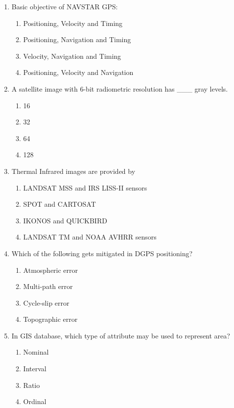 \documentclass[12pt,a4paper]{article}
\begin{document}
\begin{enumerate}
\item Basic objective of NAVSTAR GPS:
\begin{enumerate}
    \item Positioning, Velocity and Timing
    \item Positioning, Navigation and Timing
    \item Velocity, Navigation and Timing
    \item Positioning, Velocity and Navigation
\end{enumerate}

\item A satellite image with 6-bit radiometric resolution has \_\_\_ gray levels.
\begin{enumerate}
    \item 16
    \item 32
    \item 64
    \item 128
\end{enumerate}

\item Thermal Infrared images are provided by
\begin{enumerate}
    \item LANDSAT MSS and IRS LISS-II sensors
    \item SPOT and CARTOSAT
    \item IKONOS and QUICKBIRD
    \item LANDSAT TM and NOAA AVHRR sensors
\end{enumerate}

\item Which of the following gets mitigated in DGPS positioning?
\begin{enumerate}
    \item Atmospheric error
    \item Multi-path error
    \item Cycle-slip error
    \item Topographic error
\end{enumerate}

\item In GIS database, which type of attribute may be used to represent area?
\begin{enumerate}
    \item Nominal
    \item Interval
    \item Ratio
    \item Ordinal
\end{enumerate}


\end{enumerate}
\end{document}
